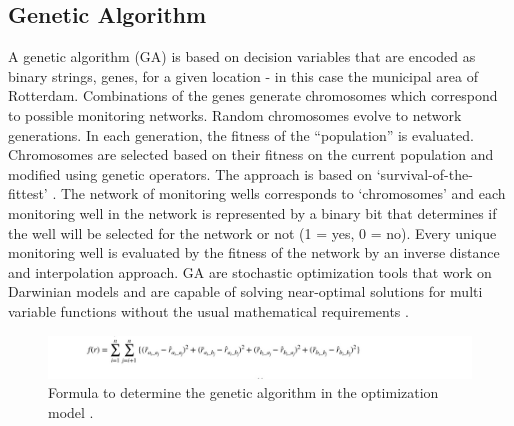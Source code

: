 
\subsection{Genetic Algorithm}
A genetic algorithm (GA) is based on decision variables that are encoded as binary strings, genes, for a given location - in this case the municipal area of Rotterdam. Combinations of the genes generate chromosomes which correspond to possible monitoring networks. Random chromosomes evolve to network generations. In each generation, the fitness of the “population” is evaluated. Chromosomes are selected based on their fitness on the current population and modified using genetic operators. The approach is based on ‘survival-of-the-fittest’ \cite{hermawanto-2013}. The network of monitoring wells corresponds to ‘chromosomes’ and each monitoring well in the network is represented by a binary bit that determines if the well will be selected for the network or not (1 = yes, 0 = no). Every unique monitoring well is evaluated by the fitness of the network by an inverse distance and interpolation approach. GA are stochastic optimization tools that work on Darwinian models and are capable of solving near-optimal solutions for multi variable functions without the usual mathematical requirements \cite{ayvaz-2018}.

\begin{figure}[htbp]
    \centering
    \includegraphics[width=0.70\linewidth]{appendix/ga.png}
    \caption{Formula to determine the genetic algorithm in the optimization model \cite{koshikawa-2020}.}
    \label{GA}

\end{figure}








